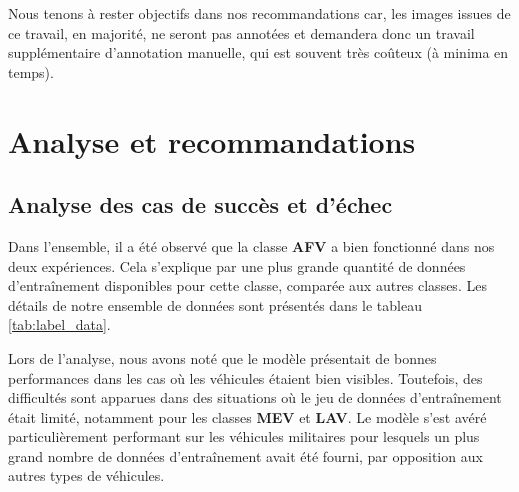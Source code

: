 Nous tenons à rester objectifs dans nos recommandations car, les images issues de ce travail, en majorité, ne seront pas annotées  et demandera donc un travail supplémentaire d’annotation manuelle, qui est souvent très coûteux (à minima en temps).















































\chapter{Analyse et recommandations}
\label{chap:4}
\sloppy

\section{Analyse des cas de succès et d'échec}

Dans l'ensemble, il a été observé que la classe \textbf{AFV} a bien fonctionné dans nos deux expériences. Cela s'explique par une plus grande quantité de données d'entraînement disponibles pour cette classe, comparée aux autres classes. Les détails de notre ensemble de données sont présentés dans le tableau \ref{tab:label_data}. 

Lors de l'analyse, nous avons noté que le modèle présentait de bonnes performances dans les cas où les véhicules étaient bien visibles. Toutefois, des difficultés sont apparues dans des situations où le jeu de données d'entraînement était limité, notamment pour les classes \textbf{MEV} et \textbf{LAV}. Le modèle s'est avéré particulièrement performant sur les véhicules militaires pour lesquels un plus grand nombre de données d'entraînement avait été fourni, par opposition aux autres types de véhicules.

